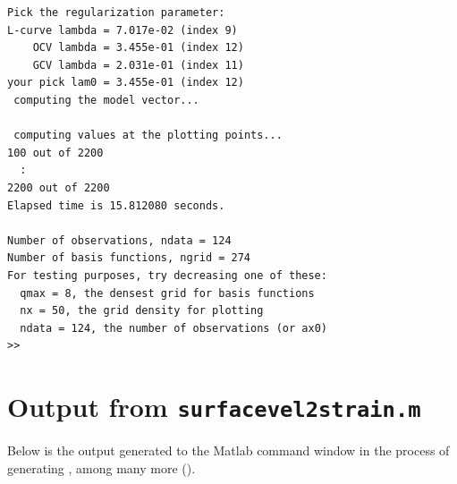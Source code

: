 \documentclass[11pt,titlepage,fleqn]{article}
\begin{document}
\begin{spacing}{1.0}
\begin{verbatim}
Pick the regularization parameter:
L-curve lambda = 7.017e-02 (index 9)
    OCV lambda = 3.455e-01 (index 12)
    GCV lambda = 2.031e-01 (index 11)
your pick lam0 = 3.455e-01 (index 12)
 computing the model vector...
  
 computing values at the plotting points...
100 out of 2200
  :
2200 out of 2200
Elapsed time is 15.812080 seconds.
  
Number of observations, ndata = 124
Number of basis functions, ngrid = 274
For testing purposes, try decreasing one of these:
  qmax = 8, the densest grid for basis functions
  nx = 50, the grid density for plotting
  ndata = 124, the number of observations (or ax0)
>> 
\end{verbatim}
\end{spacing}


\section{Output from {\tt surfacevel2strain.m}}
\label{sec:surfacevel2strain_out}

Below is the output generated to the Matlab command window in the process of generating , among many more ().
\end{document}
